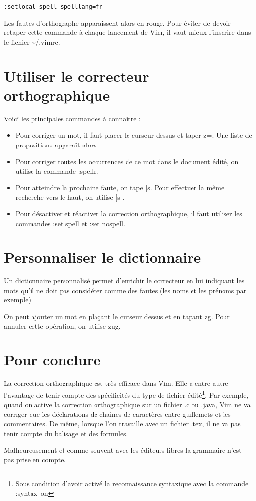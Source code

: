 \documentclass[pdftex,a4paper,11pt]{article}
\begin{document}
\begin{verbatim}
:setlocal spell spelllang=fr
\end{verbatim}

Les fautes d'orthographe apparaissent alors en rouge. Pour éviter de devoir retaper cette commande à chaque lancement de Vim, il vaut mieux l'inscrire dans le fichier \textasciitilde{}/.vimrc.


\section{Utiliser le correcteur orthographique}
Voici les principales commandes à connaître :
\begin{itemize}
	\item Pour corriger un mot, il faut placer le curseur dessus et taper \og{}z=\fg{}. Une liste de propositions apparaît alors.
	\item Pour corriger toutes les occurrences de ce mot dans le document édité, on utilise la commande \og{}:spellr\fg{}.
	\item Pour atteindre la prochaine faute, on tape \og{}]s\fg{}. Pour effectuer la même recherche vers le haut, on utilise \og [s \fg.
	\item Pour désactiver et réactiver la correction orthographique, il faut utiliser les commandes \og{}:set spell\fg{} et \og{}:set nospell\fg{}.
\end{itemize}


\section{Personnaliser le dictionnaire}
Un dictionnaire personnalisé permet d'enrichir le correcteur en lui indiquant les mots qu'il ne doit pas considérer comme des fautes (les noms et les prénoms par exemple).

On peut ajouter un mot en plaçant le curseur dessus et en tapant \og{}zg\fg{}. Pour annuler cette opération, on utilise \og{}zug\fg{}.


\section{Pour conclure}
La correction orthographique est très efficace dans Vim. Elle a entre autre l'avantage de tenir compte des spécificités du type de fichier édité\footnote{Sous condition d'avoir activé la reconnaissance syntaxique avec la commande \og{}:syntax~on\fg{}}. Par exemple, quand on active la correction orthographique sur un fichier .c ou .java, Vim ne va corriger que les déclarations de chaînes de caractères entre guillemets et les commentaires. De même, lorsque l'on travaille avec un fichier .tex, il ne va pas tenir compte du balisage et des formules.

Malheureusement et comme souvent avec les éditeurs libres la grammaire n'est pas prise en compte.
\end{document}

